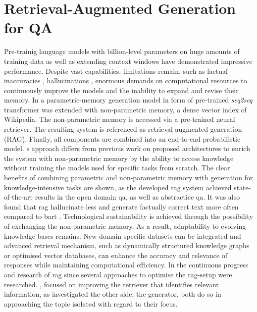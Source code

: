 \section{Retrieval-Augmented Generation for QA}

Pre-trainig language models with billion-level parameters on huge amounts of training data as well as extending context windows have demonstrated impressive performance.
Despite vast capabilities, limitations remain, such as factual inaccuracies \citep{augenstein2023factualitychallengeseralarge}, hallucinations \citep{fan2024surveyragmeetingllms}, enormous demands on computational resources to continuously improve the models and the inability to expand and revise their memory.\citep{lewis2020ragnlp}
In \citet{lewis2020ragnlp} a parametric-memory generation model in form of pre-trained \textit{seq2seq} transformer was extended with non-parametric memory, a dense vector index of Wikipedia.
The non-parametric memory is accessed via a pre-trained neural retriever.
The resulting system is referenced as retrieval-augmented generation (RAG).
Finally, all components are combined into an end-to-end probabilistic model. 
\citet{lewis2020ragnlp}s approach differs from previous work on proposed architectures to enrich the system with non-parametric memory by the ability to access knowledge without training the models used for specific tasks from scratch.
The clear benefits of combining parametric and non-parametric memory with generation for knowledge-intensive tasks are shown, as the developed \ac{rag} system achieved state-of-the-art results in the open domain \ac{qa}, as well as abstractice \ac{qa}.
It was also found that \ac{rag} hallucinate less and generate factually correct text more often compared to \ac{bart} \citep{lewis2020ragnlp}.
Technological sustainability is achieved through the possibility of exchanging the non-parametric memory.
As a result, adaptability to evolving knowledge bases remains.
New domain-specific datasets can be integrated and advanced retrieval mechanism, such as dynamically structured knowledge graphs or optimised vector databases, can enhance the accuracy and relevance of responses while maintaining computational efficiency.
%
In the continuous progress and research of \ac{rag} since \citet{lewis2020ragnlp} several approaches to optimise the \ac{rag}-setup were researched.
\citet{izacard2022unsupervised, Karpukhin2020DensePR}, focused on improving the retriever that identifies relevant information, as \citet{Agarwal2024ManyShotIL, liu2024lostmiddle} investigated the other side, the generator, both do so in approaching the topic isolated with regard to their focus.
